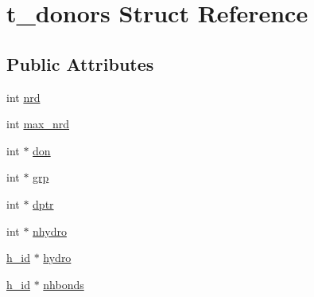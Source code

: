 \hypertarget{structt__donors}{\section{t\-\_\-donors \-Struct \-Reference}
\label{structt__donors}
}
\subsection*{\-Public \-Attributes}
\begin{DoxyCompactItemize}
\item 
int \hyperlink{structt__donors_aec1b63043d369c49427f51b2f8e1327f}{nrd}
\item 
int \hyperlink{structt__donors_a14328c400108abcc955e258c0be6e70f}{max\-\_\-nrd}
\item 
int $\ast$ \hyperlink{structt__donors_a8a51d30f3f3c35b222ddc19981817ab3}{don}
\item 
int $\ast$ \hyperlink{structt__donors_a86f60dc0777a8af09de284a54050f962}{grp}
\item 
int $\ast$ \hyperlink{structt__donors_ae339a5ed5241d34fb7956e8efd202309}{dptr}
\item 
int $\ast$ \hyperlink{structt__donors_a08f8d0ec7c7c2e196e709d815ab373b4}{nhydro}
\item 
\hyperlink{gmx__hbond_8c_ab9da24ffcda463c10b557ea7eaf8ee7f}{h\-\_\-id} $\ast$ \hyperlink{structt__donors_a1b1249da150787838c412cd594c032ba}{hydro}
\item 
\hyperlink{gmx__hbond_8c_ab9da24ffcda463c10b557ea7eaf8ee7f}{h\-\_\-id} $\ast$ \hyperlink{structt__donors_ade9b44c12eaab75e8a401badbc97dec2}{nhbonds}
\end{DoxyCompactItemize}


